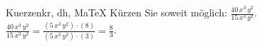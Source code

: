 \begin{MAufgabe}{Kuerzen}{kr, dh, MaTeX}
K\"urzen Sie soweit m\"oglich: $\frac{40\, x^3\, y^2}{15\, x^3\, y^2}$.\\ 
\ifLsg\MLoesung
\quad $\frac{40\, x^3\, y^2}{15\, x^3\, y^2}=\frac{(5\, x^3\, y^2)\cdot(8)}{(5\, x^3\, y^2)\cdot(3)}=\frac{8}{3}$.\else\relax\fi
 \end{MAufgabe}